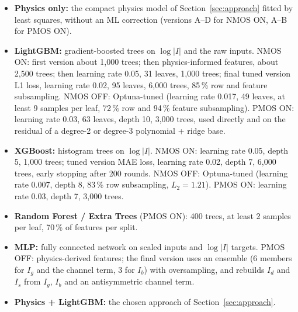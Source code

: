 \documentclass[12pt]{article}
\begin{document}
\begin{itemize}
    \item \textbf{Physics only:} the compact physics model of Section~\ref{sec:approach} fitted by least squares,
          without an ML correction (versions A--D for NMOS ON, A--B for PMOS ON).
    \item \textbf{LightGBM:} gradient-boosted trees on $\log|I|$ and the raw inputs. NMOS ON:
          first version about 1{,}000 trees; then physics-informed features, about 2{,}500 trees;
          then learning rate 0.05, 31 leaves, 1{,}000 trees; final tuned version L1 loss, learning
          rate 0.02, 95 leaves, 6{,}000 trees, 85\,\% row and feature subsampling. NMOS OFF:
          Optuna-tuned (learning rate 0.017, 49 leaves, at least 9 samples per leaf, 72\,\% row and
          94\,\% feature subsampling). PMOS ON: learning rate 0.03, 63 leaves, depth 10,
          3{,}000 trees, used directly and on the residual of a degree-2 or degree-3 polynomial +
          ridge base.
    \item \textbf{XGBoost:} histogram trees on $\log|I|$. NMOS ON: learning rate 0.05, depth 5,
          1{,}000 trees; tuned version MAE loss, learning rate 0.02, depth 7, 6{,}000 trees, early
          stopping after 200 rounds. NMOS OFF: Optuna-tuned (learning rate 0.007, depth 8, 83\,\%
          row subsampling, $L_2=1.21$). PMOS ON: learning rate 0.03, depth 7, 3{,}000 trees.
    \item \textbf{Random Forest / Extra Trees} (PMOS ON): 400 trees, at least 2 samples per leaf,
          70\,\% of features per split.
    \item \textbf{MLP:} fully connected network on scaled inputs and $\log|I|$ targets. PMOS OFF:
          physics-derived features; the final version uses an ensemble (6 members for $I_g$ and the
          channel term, 3 for $I_b$) with oversampling, and rebuilds $I_d$ and $I_s$ from $I_g$,
          $I_b$ and an antisymmetric channel term.
    \item \textbf{Physics + LightGBM:} the chosen approach of Section~\ref{sec:approach}.
\end{itemize}
\end{document}
